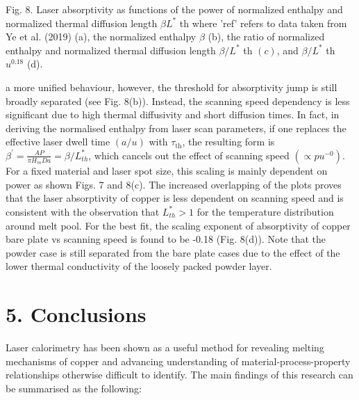 \documentclass[10pt]{article}
\begin{document}
Fig. 8. Laser absorptivity as functions of the power of normalized enthalpy and normalized thermal diffusion length $\beta L^{*}$ th where 'ref' refers to data taken from Ye et al. (2019) (a), the normalized enthalpy $\beta$ (b), the ratio of normalized enthalpy and normalized thermal diffusion length $\beta / L^{*}$ th $(c)$, and $\beta / L^{*}$ th $u^{0.18}$ (d).

a more unified behaviour, however, the threshold for absorptivity jump is still broadly separated (see Fig. 8(b)). Instead, the scanning speed dependency is less significant due to high thermal diffusivity and short diffusion times. In fact, in deriving the normalised enthalpy from laser scan parameters, if one replaces the effective laser dwell time $(a / u)$ with $\tau_{\mathrm{th}}$, the resulting form is $\beta^{\prime}=\frac{A P}{\pi H_{m} D a}=\beta / L_{t h}^{*}$, which cancels out the effect of scanning speed $\left(\propto p u^{-0}\right)$. For a fixed material and laser spot size, this scaling is mainly dependent on power as shown Figs. 7 and 8(c). The increased overlapping of the plots proves that the laser absorptivity of copper is less dependent on scanning speed and is consistent with the observation that $L_{t h}^{*}>1$ for the temperature distribution around melt pool. For the best fit, the scaling exponent of absorptivity of copper bare plate vs scanning speed is found to be -0.18 (Fig. 8(d)). Note that the powder case is still separated from the bare plate cases due to the effect of the lower thermal conductivity of the loosely packed powder layer.

\section*{5. Conclusions}
Laser calorimetry has been shown as a useful method for revealing melting mechanisms of copper and advancing understanding of material-process-property relationships otherwise difficult to identify. The main findings of this research can be summarised as the following:
\end{document}
